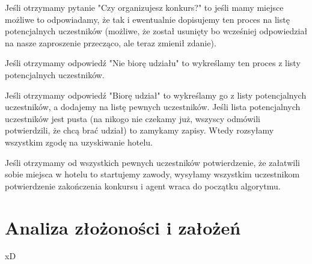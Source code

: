 \documentclass{article}
\begin{document}
\begin{tightlist}
\item Jeśli otrzymamy pytanie "Czy organizujesz konkurs?" to jeśli mamy miejsce możliwe to odpowiadamy, że tak i ewentualnie dopisujemy ten proces na listę potencjalnych uczestników (możliwe, że został usunięty bo wcześniej odpowiedział na nasze zaproszenie przecząco, ale teraz zmienił zdanie). 
\item Jeśli otrzymamy odpowiedź "Nie biorę udziału" to wykreślamy ten proces z listy potencjalnych uczestników.
\item Jeśli otrzymamy odpowiedź "Biorę udział" to wykreślamy go z listy potencjalnych uczestników, a dodajemy na listę pewnych uczestników. Jeśli lista potencjalnych uczestników jest pusta (na nikogo nie czekamy już, wszyscy odmówili potwierdzili, że chcą brać udział) to zamykamy zapisy. Wtedy rozsyłamy wszystkim zgodę na uzyskiwanie hotelu.
\end{tightlist}

Jeśli otrzymamy od wszystkich pewnych uczestników potwierdzenie, że załatwili sobie miejsca w hotelu to startujemy zawody, wysyłamy wszystkim uczestnikom potwierdzenie zakończenia konkursu i agent wraca do początku algorytmu.


\section{Analiza złożoności i założeń}

xD




\end{document}
